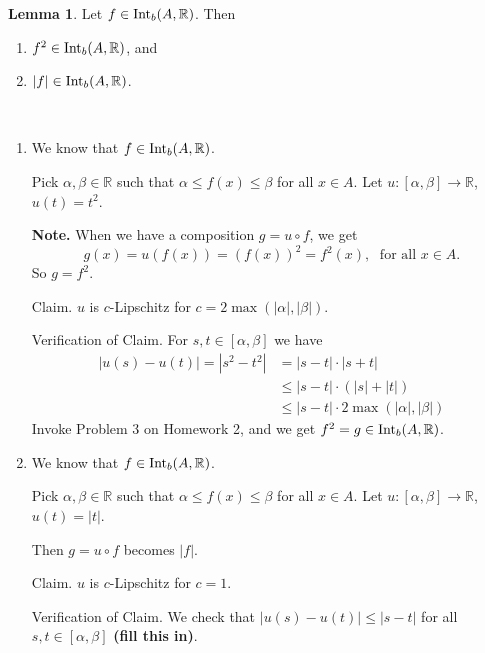 \documentclass[11pt]{article}
\makeatletter
\theoremstyle{definition}
\newtheorem{lemma}[thm]{Lemma}
\newcommand{\R}{\ensuremath{\mathbb{R}}}
\newenvironment{pf}[1][\proofname]{\par
  \pushQED{\qed}%
  \normalfont \topsep0\p@\relax
  \trivlist
  \item[\hskip\labelsep\itshape
  #1\@addpunct{.}]\ignorespaces
}{%
  \popQED\endtrivlist\@endpefalse
}
\makeatother
\begin{document}
\begin{lemma}
Let $f \in {\rm Int}_b (A, \R)$. Then \vspace{-1.5ex}
\begin{enumerate}[(1)]
\item $f^2 \in {\rm Int}_b (A, \R)$, and
\item $|f| \in {\rm Int}_b (A, \R)$.
\end{enumerate}
\end{lemma}
\begin{pf}~ \vspace{-1.5ex}
\begin{enumerate}[(1)]

\item We know that $f \in {\rm Int}_b (A, \R)$. 

Pick $\alpha, \beta \in \R$ such that $\alpha \leq f(x) \leq \beta$ for all $x \in A$. Let $u : [\alpha, \beta] \to \R$, $u(t) = t^2$. 

{\bf Note.} When we have a composition $g = u \circ f$, we get
$$g(x) = u(f(x)) = (f(x))^2 = f^2(x), \; \text{ for all } x \in A.$$
So $g = f^2$.

{\sc Claim.} $u$ is $c$-Lipschitz for $c = 2\max\left(|\alpha|, |\beta|\right)$. 

{\sc Verification of Claim.} For $s, t \in [\alpha, \beta]$ we have 
\begin{align*}
|u(s) - u(t)| = |s^2 - t^2| 
&= |s - t| \cdot |s + t| \\
&\leq |s - t| \cdot \left(|s| + |t|\right) \\
&\leq |s - t| \cdot 2\max\left(|\alpha|, |\beta|\right)
\end{align*}
Invoke Problem 3 on Homework 2, and we get $f^2 = g \in {\rm Int}_b (A, \R)$. 

\item We know that $f \in {\rm Int}_b (A, \R)$. 

Pick $\alpha, \beta \in \R$ such that $\alpha \leq f(x) \leq \beta$ for all $x \in A$. Let $u : [\alpha, \beta] \to \R$, $u(t) = |t|$. 

Then $g = u \circ f$ becomes $|f|$. 

{\sc Claim.} $u$ is $c$-Lipschitz for $c = 1$. 

{\sc Verification of Claim.} We check that $|u(s) - u(t)| \leq |s - t|$ for all $s, t \in [\alpha, \beta]$ {\bf (fill this in)}. \qedhere
\end{enumerate}
\end{pf}
\end{document}
